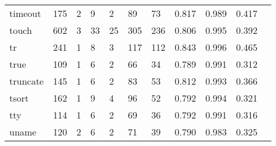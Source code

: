 \begin{longtable}{lp{1.10cm}p{1.10cm}p{1.10cm}p{1.10cm}p{1.10cm}p{1.10cm}p{1.10cm}p{1.10cm}p{1.10cm}p{1.10cm}}
timeout   &                    175 &                                  2 &                                 9 &                                2 &                                89 &                              73 &                             0.817 &                                 0.989 &                               0.417 \\
touch     &                    602 &                                  3 &                                33 &                               25 &                               305 &                             236 &                             0.806 &                                 0.995 &                               0.392 \\
tr        &                    241 &                                  1 &                                 8 &                                3 &                               117 &                             112 &                             0.843 &                                 0.996 &                               0.465 \\
true      &                    109 &                                  1 &                                 6 &                                2 &                                66 &                              34 &                             0.789 &                                 0.991 &                               0.312 \\
truncate  &                    145 &                                  1 &                                 6 &                                2 &                                83 &                              53 &                             0.812 &                                 0.993 &                               0.366 \\
tsort     &                    162 &                                  1 &                                 9 &                                4 &                                96 &                              52 &                             0.792 &                                 0.994 &                               0.321 \\
tty       &                    114 &                                  1 &                                 6 &                                2 &                                69 &                              36 &                             0.792 &                                 0.991 &                               0.316 \\
uname     &                    120 &                                  2 &                                 6 &                                2 &                                71 &                              39 &                             0.790 &                                 0.983 &                               0.325 \\

\end{longtable}
